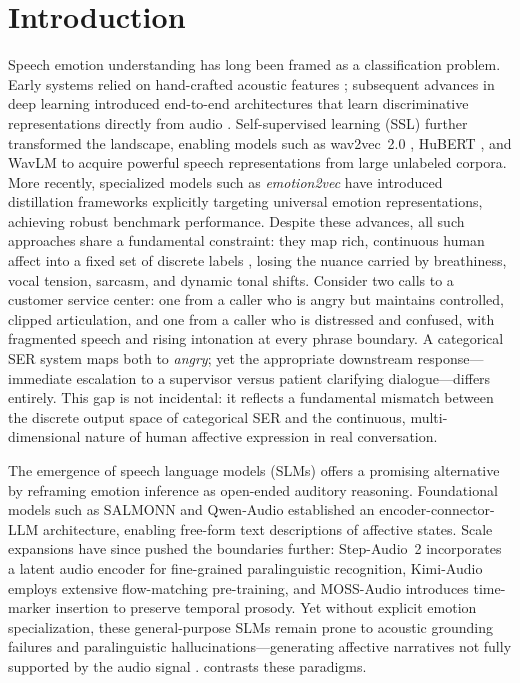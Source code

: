 \section{Introduction}

Speech emotion understanding has long been framed as a classification problem. Early systems relied on hand-crafted acoustic features \cite{elayadi2011survey, ververidis2006emotional}; subsequent advances in deep learning introduced end-to-end architectures that learn discriminative representations directly from audio \cite{trigeorgis2016adieu}. Self-supervised learning (SSL) further transformed the landscape, enabling models such as wav2vec~2.0 \cite{Wav2vec2}, HuBERT \cite{HuBERT}, and WavLM \cite{WavLM} to acquire powerful speech representations from large unlabeled corpora. More recently, specialized models such as \textit{emotion2vec} \cite{emotion2vec} have introduced distillation frameworks explicitly targeting universal emotion representations, achieving robust benchmark performance. Despite these advances, all such approaches share a fundamental constraint: they map rich, continuous human affect into a fixed set of discrete labels \cite{SUPERB}, losing the nuance carried by breathiness, vocal tension, sarcasm, and dynamic tonal shifts. Consider two calls to a customer service center: one from a caller who is angry but maintains controlled, clipped articulation, and one from a caller who is distressed and confused, with fragmented speech and rising intonation at every phrase boundary. A categorical SER system maps both to \textit{angry}; yet the appropriate downstream response—immediate escalation to a supervisor versus patient clarifying dialogue—differs entirely. This gap is not incidental: it reflects a fundamental mismatch between the discrete output space of categorical SER and the continuous, multi-dimensional nature of human affective expression in real conversation.

The emergence of speech language models (SLMs) offers a promising alternative by reframing emotion inference as open-ended auditory reasoning. Foundational models such as SALMONN \cite{SALMONN} and Qwen-Audio \cite{Qwen-Audio} established an encoder-connector-LLM architecture, enabling free-form text descriptions of affective states. Scale expansions have since pushed the boundaries further: Step-Audio~2 \cite{Step-Audio2} incorporates a latent audio encoder for fine-grained paralinguistic recognition, Kimi-Audio \cite{Kimi-Audio} employs extensive flow-matching pre-training, and MOSS-Audio \cite{MOSS-Audio} introduces time-marker insertion to preserve temporal prosody. Yet without explicit emotion specialization, these general-purpose SLMs remain prone to acoustic grounding failures and paralinguistic hallucinations---generating affective narratives not fully supported by the audio signal \cite{Qwen2-Audio}.  contrasts these paradigms.

